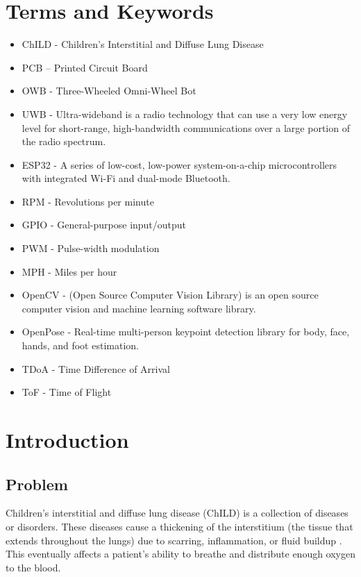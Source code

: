 \documentclass[journal,onecolumn, draftclsnofoot, 12pt]{IEEEtran}
\begin{document}
\section{Terms and Keywords}
\vspace{0.8cm}
\begin{itemize}
    \item ChILD - Children's Interstitial and Diffuse Lung Disease
    \item PCB – Printed Circuit Board
    \item OWB - Three-Wheeled Omni-Wheel Bot
    \item UWB - Ultra-wideband is a radio technology that can use a very low energy level for short-range, high-bandwidth communications over a large portion of the radio spectrum.
    \item ESP32 - A series of low-cost, low-power system-on-a-chip microcontrollers with integrated Wi-Fi and dual-mode Bluetooth.
    \item RPM - Revolutions per minute
    \item GPIO - General-purpose input/output
    \item PWM - Pulse-width modulation
    \item MPH - Miles per hour
    \item OpenCV - (Open Source Computer Vision Library) is an open source computer vision and machine learning software library.
    \item OpenPose - Real-time multi-person keypoint detection library for body, face, hands, and foot estimation.
    \item TDoA - Time Difference of Arrival 
    \item ToF - Time of Flight
\end{itemize}

\pagebreak

\section{Introduction}

\subsection{Problem}
Children's interstitial and diffuse lung disease (ChILD) is a collection of diseases or disorders. These diseases cause a thickening of the interstitium (the tissue that extends throughout the lungs) due to scarring, inflammation, or fluid buildup \cite{ChILD-2022}. This eventually affects a patient’s ability to breathe and distribute enough oxygen to the blood.
\end{document}
